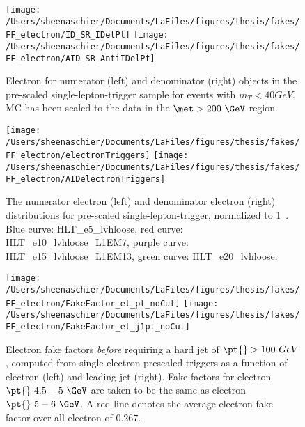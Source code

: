 \begin{figure}[tbp]
  \centering
  \texttt{[image: /Users/sheenaschier/Documents/LaFiles/figures/thesis/fakes/FF\_electron/ID\_SR\_IDelPt]}
  \texttt{[image: /Users/sheenaschier/Documents/LaFiles/figures/thesis/fakes/FF\_electron/AID\_SR\_AntiIDelPt]}\\
  \caption{Electron \pt{} for numerator (left) and denominator (right) objects in the pre-scaled single-lepton-trigger sample for events with $m_{T} < 40 GeV$.  MC has been scaled to the data in the $\met > 200~\GeV$ region.}
  \label{fig:elec_FF_dists_pt}
\end{figure}

\begin{figure}[tbp]
  \centering
  \texttt{[image: /Users/sheenaschier/Documents/LaFiles/figures/thesis/fakes/FF\_electron/electronTriggers]}
  \texttt{[image: /Users/sheenaschier/Documents/LaFiles/figures/thesis/fakes/FF\_electron/AIDelectronTriggers]}\\
  \caption{The numerator electron (left) and denominator electron (right) \pt{} distributions for pre-scaled single-lepton-trigger, normalized to 1~\ipb{}. Blue curve: HLT\_e5\_lvhloose, red curve: HLT\_e10\_lvhloose\_L1EM7, purple curve: HLT\_e15\_lvhloose\_L1EM13, green curve: HLT\_e20\_lvhloose.}
  \label{fig:triggers}
\end{figure}


\begin{figure}[tbp]
  \centering
  \texttt{[image: /Users/sheenaschier/Documents/LaFiles/figures/thesis/fakes/FF\_electron/FakeFactor\_el\_pt\_noCut]}
  \texttt{[image: /Users/sheenaschier/Documents/LaFiles/figures/thesis/fakes/FF\_electron/FakeFactor\_el\_j1pt\_noCut]}\\
  \caption{Electron fake factors \textit{before} requiring a hard jet of $\pt{} > 100~GeV$, computed from single-electron prescaled triggers as a function of electron \pt{} (left) and leading jet \pt{} (right). Fake factors for electron $\pt{}~ 4.5-5~\GeV$ are taken to be the same as electron $\pt{}~5-6~\GeV$.  A red line denotes the average electron fake factor over all electron \pt{} of 0.267. }
  \label{fig:elec_FF_hist_noCut}
\end{figure}


